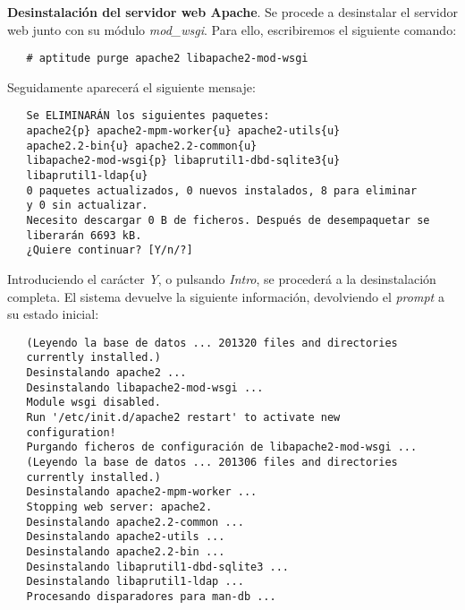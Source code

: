 \item \textbf{Desinstalación del servidor web Apache}.
   Se procede a desinstalar el servidor web junto con su módulo
   \textit{mod\_wsgi}. Para ello, escribiremos el siguiente comando:

   \begin{verbatim}
   # aptitude purge apache2 libapache2-mod-wsgi
   \end{verbatim}

   Seguidamente aparecerá el siguiente mensaje:

   \begin{verbatim}
   Se ELIMINARÁN los siguientes paquetes:
   apache2{p} apache2-mpm-worker{u} apache2-utils{u}
   apache2.2-bin{u} apache2.2-common{u}
   libapache2-mod-wsgi{p} libaprutil1-dbd-sqlite3{u}
   libaprutil1-ldap{u}
   0 paquetes actualizados, 0 nuevos instalados, 8 para eliminar
   y 0 sin actualizar.
   Necesito descargar 0 B de ficheros. Después de desempaquetar se
   liberarán 6693 kB.
   ¿Quiere continuar? [Y/n/?]
   \end{verbatim}

   Introduciendo el carácter \textit{Y}, o pulsando \textit{Intro}, se procederá
   a la desinstalación completa. El sistema devuelve la siguiente información,
   devolviendo el \textit{prompt} a su estado inicial:

   \begin{verbatim}
   (Leyendo la base de datos ... 201320 files and directories
   currently installed.)
   Desinstalando apache2 ...
   Desinstalando libapache2-mod-wsgi ...
   Module wsgi disabled.
   Run '/etc/init.d/apache2 restart' to activate new
   configuration!
   Purgando ficheros de configuración de libapache2-mod-wsgi ...
   (Leyendo la base de datos ... 201306 files and directories
   currently installed.)
   Desinstalando apache2-mpm-worker ...
   Stopping web server: apache2.
   Desinstalando apache2.2-common ...
   Desinstalando apache2-utils ...
   Desinstalando apache2.2-bin ...
   Desinstalando libaprutil1-dbd-sqlite3 ...
   Desinstalando libaprutil1-ldap ...
   Procesando disparadores para man-db ...
   \end{verbatim}
